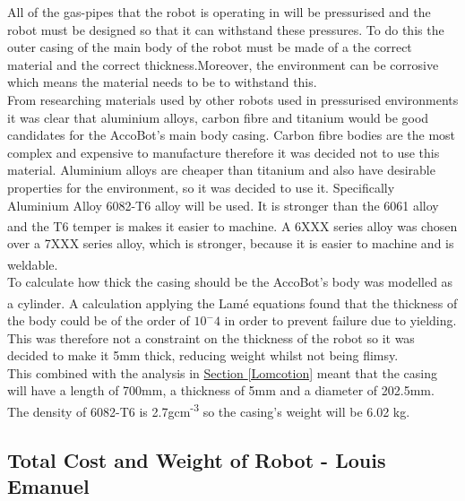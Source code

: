 \documentclass[11pt]{article}		%
\newcommand{\supercite}[1]{\textsuperscript{\cite{#1}}}		%
\newcommand{\sectref}[1]{\hyperref[#1]{Section \ref*{#1}}}     %
\begin{document}
			All of the gas-pipes that the robot is operating in will be pressurised and the robot must be designed so that it can withstand these pressures. To do this the outer casing of the main body of the robot must be made of a the correct material and the correct thickness.Moreover, the environment can be corrosive which means the material needs to be to withstand this.
			\\
            \hspace*{3ex}From researching materials used by other robots used in pressurised environments it was clear that aluminium alloys, carbon fibre and titanium would be good candidates for the AccoBot's main body casing. Carbon fibre bodies are the most complex and expensive to manufacture therefore it was decided not to use this material. Aluminium alloys are cheaper than titanium and also have desirable properties for the environment, so it was decided to use it.
		    Specifically Aluminium Alloy 6082-T6 alloy will be used. It is stronger than the 6061 alloy and the T6 temper is makes it easier to machine.\supercite{Aluminium_Alloys} A 6XXX series alloy was chosen over a 7XXX series alloy, which is stronger, because it is easier to machine and is weldable. \supercite{Aluminium_Alloys_differences}
		    \\
            \hspace*{3ex}To calculate how thick the casing should be the AccoBot's body was modelled as a cylinder. A calculation applying the Lamé equations \supercite{lame} found that the thickness of the body could be of the order of $10^-4$ in order to prevent failure due to yielding. This was therefore not a constraint on the thickness of the robot so it was decided to make it 5mm thick, reducing weight whilst not being flimsy.
		   \\
            \hspace*{3ex}This combined with the analysis in \sectref{Lomcotion} meant that the casing will have a length of 700mm, a thickness of 5mm and a diameter of 202.5mm. The density of 6082-T6 is 2.7gcm\textsuperscript{-3} so the casing's weight will be 6.02 kg.
		   
   		\subsection[Total Cost and Weight of Robot]{Total Cost and Weight of Robot - Louis Emanuel}
   		
\end{document}

